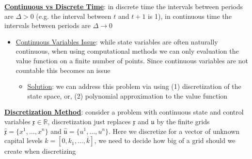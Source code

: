 \documentclass{article}
\begin{document}
\par \underline{\bf{Continuous vs Discrete Time}}: in discrete time the intervals between periods are $\Delta>0$ (e.g. the interval between $t$ and $t+1$ is 1), in continuous time the intervals between periods are $\Delta \rightarrow 0$
\begin{itemize}
    \item  \underline{Continuous Variables Issue}: while state variables are often naturally continuous, when using computational methods we can only evaluation the value function  on a finite number of points. Since continuous variables are not countable this becomes an issue
    \begin{itemize}
        \item \underline{Solution}: we can address this problem via using (1) discretization of the state space, or, (2) polynomial approximation to the value function
    \end{itemize}
\end{itemize}
\vspace{2.5mm}
\par \underline{\bf{Discretization Method}}: consider a problem with continuous state and control variables $\mathfrak{x} \in \mathbb{R}$, discretization just replaces $\mathfrak{x}$ and $\mathfrak{u}$ by the finite grids $\widehat{\mathfrak{x}} = \{ x^{1}, \dots, x^{n} \}$ and $\widehat{\mathfrak{u}} = \{ u^{1}, \dots, u^{n} \}$. Here we discretize for a vector of unknown capital levels $k = [0, k_{1}, \dots, \overline{k}]$, we need to decide how big of a grid should we create when discretizing
\end{document}
